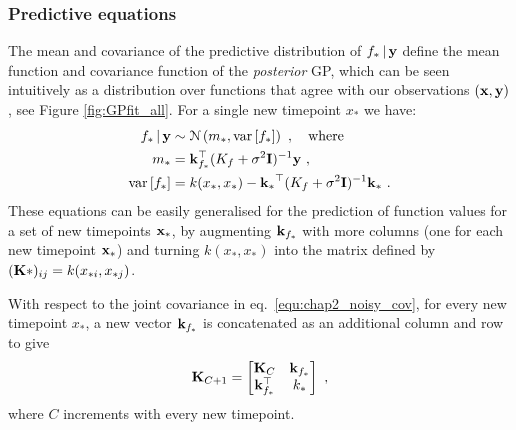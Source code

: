 

      \subsubsection{Predictive equations}
	The mean and covariance of the predictive distribution of $f_* \,|\, \mathbf{y}$ define
	the mean function and covariance function of the \textit{posterior} GP,
	which can be seen intuitively as a distribution over functions that
	agree with our observations $(\mathbf{x},\mathbf{y})$, see Figure \ref{fig:GPfit_all}.
	For a single new timepoint $x_*$ we have:
	\begin{align}
	  \nonumber f_* \,|\, \mathbf{y} &\sim \mathcal{N} \left( m_*, \textrm{var}\left[f_*\right] \right) ~, \quad \textrm{where} \\
	  \label{equ:chap2_predictive_mean} m_* &= \mathbf{k}^\top_{f_*} (K_f + \sigma^2 \mathbf{I})^{-1} \mathbf{y} ~, \\
	  \label{equ:chap2_predictive_cov}  \textrm{var}\left[f_*\right] &= k(x_*,x_*) - \mathbf{k_*}^\top
	  (K_f + \sigma^2 \mathbf{I})^{-1}\mathbf{k_*} ~.
	\end{align}
	These equations can be easily generalised for the prediction of function
	values for a set of new timepoints $\mathbf{x}_*$, by augmenting
	$\mathbf{k}_{f_*}$ with more columns (one for each new timepoint $\mathbf{x_*}$)
	and turning $k(x_*, x_*)$ into the matrix defined by $(\mathbf{K*})_{ij} = k(x_{*i}, x_{*j})$.

	With respect to the joint covariance in eq.~\eqref{equ:chap2_noisy_cov},
	for every new timepoint $x_*$, a new vector $\mathbf{k}_{f_*}$ is concatenated
	as an additional column and row  to give
	\begin{equation*}
	  \mathbf{K}_{C+1} = \begin{bmatrix}  \mathbf{K}_C & \mathbf{k}_{f_*} \\ \mathbf{k}_{f_*}^\top &k_*  \end{bmatrix} ~,
	\end{equation*}
	where $C$ increments with every new timepoint.
    

